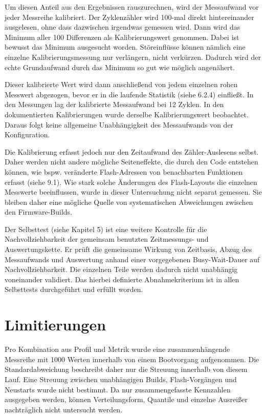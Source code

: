 Um diesen Anteil aus den Ergebnissen rauszurechnen, wird der Messaufwand vor jeder Messreihe kalibriert. Der Zyklenz{\"a}hler wird 100-mal direkt hintereinander ausgelesen, ohne dass dazwischen irgendwas gemessen wird. Dann wird das Minimum aller 100 Differenzen als Kalibrierungswert genommen. Dabei ist bewusst das Minimum ausgesucht worden. St{\"o}reinfl{\"u}sse k{\"o}nnen n{\"a}mlich eine einzelne Kalibrierungsmessung nur verl{\"a}ngern, nicht verk{\"u}rzen. Dadurch wird der echte Grundaufwand durch das Minimum so gut wie m{\"o}glich angen{\"a}hert.

Dieser kalibrierte Wert wird dann anschlie{\ss}end von jedem einzelnen rohen Messwert abgezogen, bevor er in die laufende Statistik (siehe 6.2.4) einflie{\ss}t. In den Messungen lag der kalibrierte Messaufwand bei 12 Zyklen. In den dokumentierten Kalibrierungen wurde derselbe Kalibrierungswert beobachtet. Daraus folgt keine allgemeine Unabh{\"a}ngigkeit des Messaufwands von der Konfiguration.

Die Kalibrierung erfasst jedoch nur den Zeitaufwand des Z{\"a}hler-Auslesens selbst. Daher werden nicht andere m{\"o}gliche Seiteneffekte, die durch den Code entstehen k{\"o}nnen, wie bspw. ver{\"a}nderte Flash-Adressen von benachbarten Funktionen erfasst (siehe 9.1). Wie stark solche {\"A}nderungen des Flash-Layouts die einzelnen Messwerte beeinflussen, wurde in dieser Untersuchung nicht separat gemessen. Sie bleiben daher eine m{\"o}gliche Quelle von systematischen Abweichungen zwischen den Firmware-Builds.

Der Selbsttest (siehe Kapitel 5) ist eine weitere Kontrolle f{\"u}r die Nachvollziehbarkeit der gemeinsam benutzten Zeitmessungs- und Auswertungskette. Er pr{\"u}ft die gemeinsame Wirkung von Zeitbasis, Abzug des Messaufwands und Auswertung anhand einer vorgegebenen Busy-Wait-Dauer auf Nachvollziehbarkeit. Die einzelnen Teile werden dadurch nicht unabh{\"a}ngig voneinander validiert. Das hierbei definierte Abnahmekriterium ist in allen Selbsttests durchgef{\"u}hrt und erf{\"u}llt worden.

\section{Limitierungen}
Pro Kombination aus Profil und Metrik wurde eine zusammenh{\"a}ngende Messreihe mit 1000 Werten innerhalb von einem Bootvorgang aufgenommen. Die Standardabweichung beschreibt daher nur die Streuung innerhalb von diesem Lauf. Eine Streuung zwischen unabh{\"a}ngigen Builds, Flash-Vorg{\"a}ngen und Neustarts wurde nicht bestimmt. Da nur zusammengefasste Kennzahlen ausgegeben werden, k{\"o}nnen Verteilungsform, Quantile und einzelne Ausrei{\ss}er nachtr{\"a}glich nicht untersucht werden.

